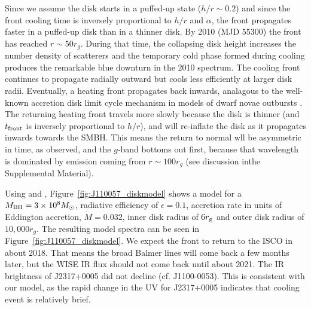 \documentclass{nature}
\begin{document}
Since we assume the disk starts in a puffed-up state ($h/r \sim 0.2$) and since the front cooling time is inversely proportional to $h/r$ and $\alpha$, the front propagates faster in a puffed-up disk than in a thinner disk. By 2010 (MJD 55300) the front has reached $r\sim50 r_{g}$. During that time, the collapsing disk height increases the number density of scatterers and the temporary cold phase formed during cooling produces the remarkable blue downturn in the 2010 spectrum. The cooling front continues to propagate radially outward but cools less efficiently at larger disk radii. Eventually, a heating front propagates back inwards, analagous to the well-known accretion disk limit cycle mechanism in models of dwarf novae outbursts \cite[e.g., ][]{Cannizzo1998}. The returning heating front travels more slowly because the disk is thinner (and $t_{\rm front}$ is inversely proportional to $h/r$), and will re-inflate the disk as it propagates inwards towards the SMBH. This means the return to normal wll be asymmetric in time, as observed, and the $g$-band bottoms out first, because that wavelength is dominated by emission coming from $r\sim100r_{g}$ (see discussion inthe Supplemental Material).

Using \cite{Ford2018} and \cite{Sirko_Goodman2003}, Figure~\ref{fig:J110057_diskmodel} shows a model for a $M_{\rm BH}=3\times 10^{8} M_{\odot}$, radiative efficiency of $\epsilon=0.1$, accretion rate in units of Eddington accretion, $\dot{M}=0.032$, inner disk radius of $6r_{\rm g}$ and outer disk radius of $10,000 r_{g}$. The resulting model spectra can be seen in Figure~\ref{fig:J110057_diskmodel}.  We expect the front to return to the ISCO in about 2018. That means the broad Balmer lines will come back a few months later, but the WISE IR flux should not come back until about 2021. The IR brightness of  J2317+0005 did not decline (cf. J1100-0053). This is consistent with our model, as the rapid change in the UV for  J2317+0005 indicates that cooling event is relatively brief.  
\end{document}
